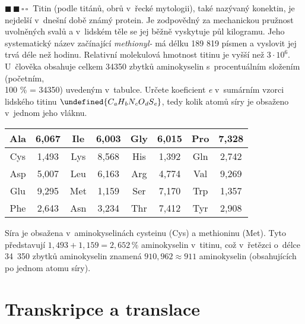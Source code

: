 \documentclass{book}
\let\ch\undefined
\newcommand{\dva}{$\blacksquare \, \blacksquare \, \square \, \square \; \; $}
\renewenvironment{quotation}{\par}{\par} %
\begin{document}
\hrulefill %
\begin{quotation}
\dva Titin (podle titánů, obrů v~řecké mytologii), také nazývaný konektin,
je nejdelší v~dnešní době známý protein. Je zodpovědný za mechanickou
pružnost uvolněných svalů a v~lidském těle se jej běžně vyskytuje
půl kilogramu. Jeho systematický název začínající \textit{methionyl-} má délku
189 819 písmen a vyslovit jej trvá déle než hodinu. Relativní molekulová
hmotnost titinu je vyšší než $3\cdot10^{6}$. U~člověka obsahuje celkem
34350 zbytků aminokyselin s~procentuálním složením (početním,\\100
\% = 34350) uvedeným v~tabulce. Určete koeficient \textit{e} v~sumárním vzorci
lidského titinu $\ch{C_{\textit{a}}H_{\textit{b}}N_{\textit{c}}O_{\textit{d}}S_{\textit{e}}}$, tedy kolik
atomů síry je obsaženo v~jednom jeho vláknu.
\begin{center}
\begin{tabular}{c|c||c|c||c|c||c|c}

Ala & 6,067 & Ile & 6,003 & Gly & 6,015 & Pro & 7,328\tabularnewline
\hline 
Cys & 1,493 & Lys & 8,568 & His & 1,392 & Gln & 2,742\tabularnewline
\hline 
Asp & 5,007 & Leu & 6,163 & Arg & 4,774 & Val & 9,269\tabularnewline
\hline 
Glu & 9,295 & Met & 1,159 & Ser & 7,170 & Trp & 1,357\tabularnewline
\hline 
Phe & 2,643 & Asn & 3,234 & Thr & 7,412 & Tyr & 2,908\tabularnewline

\end{tabular}
\par\end{center}

\end{quotation} \dotfill \par 
Síra je obsažena v~aminokyselinách cysteinu (Cys) a methioninu (Met).
Tyto představují $1,493+1,159 =2,652\,\% $ aminokyselin v~titinu, což v~řetězci o~délce 34~350
zbytků aminokyselin znamená $910,962\approx911$ aminokyselin (obsahujících
po jednom atomu síry).

\section{Transkripce a translace}
\end{document}
